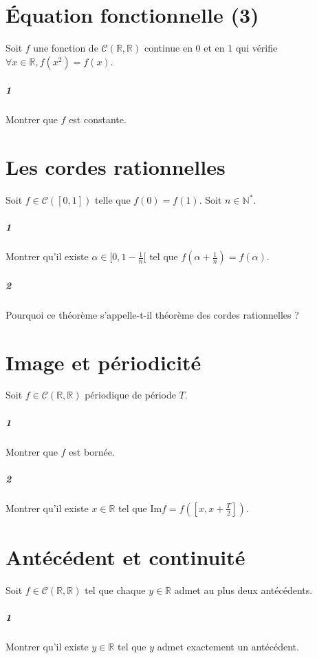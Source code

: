 \documentclass[10pt,a4paper]{article}
\begin{document}
\section{Équation fonctionnelle (3)}
Soit $f$ une fonction de $\mathcal{C}(\mathbb{R},\mathbb{R})$ continue en $0$ et en $1$ qui vérifie $\forall x \in \mathbb{R}, f(x^2)=f(x)$.
\subparagraph{1}Montrer que $f$ est constante.

\section{Les cordes rationnelles}
Soit $f \in \mathcal{C}([0,1])$ telle que $f(0)=f(1)$. Soit $n \in \mathbb{N}^*$.
\subparagraph{1} Montrer qu'il existe $\alpha \in [0,1-\frac{1}{n}[$ tel que $f(\alpha+\frac{1}{n})=f(\alpha)$.
\subparagraph{2} Pourquoi ce théorème s'appelle-t-il théorème des cordes rationnelles ?

\section{Image et périodicité}
Soit $f \in \mathcal{C}(\mathbb{R},\mathbb{R})$ périodique de période $T$.
\subparagraph{1}Montrer que $f$ est bornée.
\subparagraph{2}Montrer qu'il existe $x \in \mathbb{R}$ tel que $\text{Im}f=f([x,x+\frac{T}{2}])$.

\section{Antécédent et continuité}
Soit $f \in \mathcal{C}(\mathbb{R},\mathbb{R})$ tel que chaque $y \in \mathbb{R}$ admet au plus deux antécédents.
\subparagraph{1}Montrer qu'il existe $y \in \mathbb{R}$ tel que $y$ admet exactement un antécédent.
\end{document}
